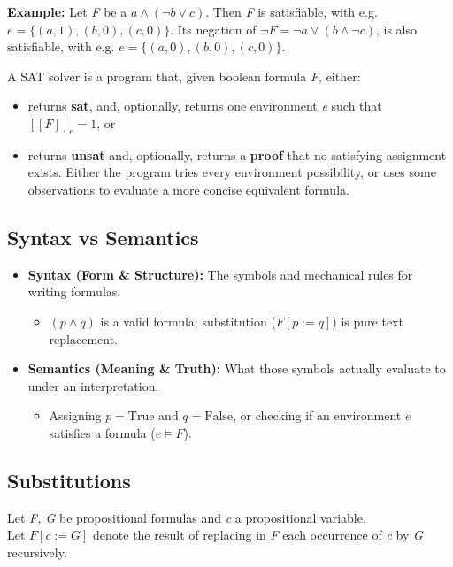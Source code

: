 \documentclass[11pt]{article}
\begin{document}
\textbf{Example:} Let \textit{F} be a $a \land (\neg b \lor c)$. Then \textit{F} is satisfiable, with e.g. $e = \{(a, 1), (b, 0), (c, 0)\}$. Its negation of $\neg F = \neg a \lor (b \land \neg c)$, is also satisfiable, with e.g. $e = \{(a, 0), (b, 0), (c, 0) \}$. 

A SAT solver is a program that, given boolean formula \textit{F}, either: 
\begin{itemize}
	\item returns \textbf{sat}, and, optionally, returns one environment \textit{e} such that $[\![F]\!]_e = 1$, or
	\item returns \textbf{unsat} and, optionally, returns a \textbf{proof} that no satisfying assignment exists. Either the program tries every environment possibility, or uses some observations to evaluate a more concise equivalent formula. 
\end{itemize}

\subsection*{Syntax vs Semantics}
\begin{itemize}
    \item \textbf{Syntax (Form \& Structure):} The symbols and mechanical rules for writing formulas.
    \begin{itemize}
        \item $(p \land q)$ is a valid formula; substitution ($F[p := q]$) is pure text replacement.
    \end{itemize}

    \item \textbf{Semantics (Meaning \& Truth):} What those symbols actually evaluate to under an interpretation.
    \begin{itemize}
        \item Assigning $p = \text{True}$ and $q = \text{False}$, or checking if an environment $e$ satisfies a formula ($e \models F$).
    \end{itemize}
\end{itemize}

\subsection*{Substitutions}

Let \textit{F, G} be propositional formulas and \textit{c} a propositional variable. \\ 
Let $F[c := G]$ denote the result of replacing in \textit{F} each occurrence of \textit{c} by \textit{G} recursively. 
\end{document}
